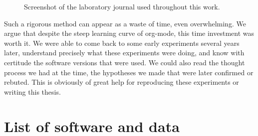     \begin{figure}[htpb]
        \centering
        \caption{Screenshot of the laboratory journal used throughout this work.}%
        \label{fig:appendix:journal_extract}
    \end{figure}

    Such a rigorous method can appear as a waste of time, even overwhelming. We argue that despite the steep learning
    curve of org-mode, this time investment was worth it. We were able to come back to some early experiments several
    years later, understand precisely what these experiments were doing, and know with certitude the software versions
    that were used. We could also read the thought process we had at the time, the hypotheses we made that were later
    confirmed or rebuted. This is obviously of great help for reproducing these experiments or writing this thesis.

\chapter{List of software and data}
\label{chapter:zenodo}


